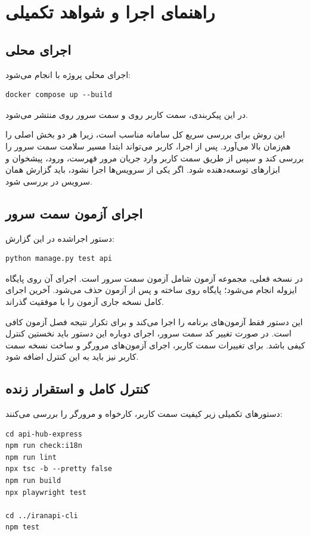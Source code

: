 \chapter{راهنمای اجرا و شواهد تکمیلی}
\thispagestyle{empty}

\section{اجرای محلی}
اجرای محلی پروژه با  انجام می‌شود:
\begin{latin}
\begin{lstlisting}
docker compose up --build
\end{lstlisting}
\end{latin}

در این پیکربندی، سمت کاربر روی  و سمت سرور روی  منتشر می‌شود.

این روش برای بررسی سریع کل سامانه مناسب است، زیرا هر دو بخش اصلی را هم‌زمان بالا می‌آورد. پس از اجرا، کاربر می‌تواند ابتدا مسیر سلامت سمت سرور را بررسی کند و سپس از طریق سمت کاربر وارد جریان مرور فهرست، ورود، پیشخوان و ابزارهای توسعه‌دهنده شود. اگر یکی از سرویس‌ها اجرا نشود، باید گزارش همان سرویس در  بررسی شود.

\section{اجرای آزمون سمت سرور}
دستور اجراشده در این گزارش:
\begin{latin}
\begin{lstlisting}
python manage.py test api
\end{lstlisting}
\end{latin}
در نسخه فعلی، مجموعه آزمون شامل  آزمون سمت سرور است. اجرای آن روی پایگاه ایزوله انجام می‌شود؛ پایگاه روی  ساخته و پس از آزمون حذف می‌شود. آخرین اجرای کامل نسخه جاری  آزمون را با موفقیت گذراند.

این دستور فقط آزمون‌های برنامه  را اجرا می‌کند و برای تکرار نتیجه فصل آزمون کافی است. در صورت تغییر کد سمت سرور، اجرای دوباره این دستور باید نخستین کنترل کیفی باشد. برای تغییرات سمت کاربر، اجرای آزمون‌های مرورگر و ساخت نسخه سمت کاربر نیز باید به این کنترل اضافه شود.

\section{کنترل کامل و استقرار زنده}
دستورهای تکمیلی زیر کیفیت سمت کاربر، کارخواه و مرورگر را بررسی می‌کنند:
\begin{latin}
\begin{lstlisting}
cd api-hub-express
npm run check:i18n
npm run lint
npx tsc -b --pretty false
npm run build
npx playwright test

cd ../iranapi-cli
npm test
\end{lstlisting}
\end{latin}

